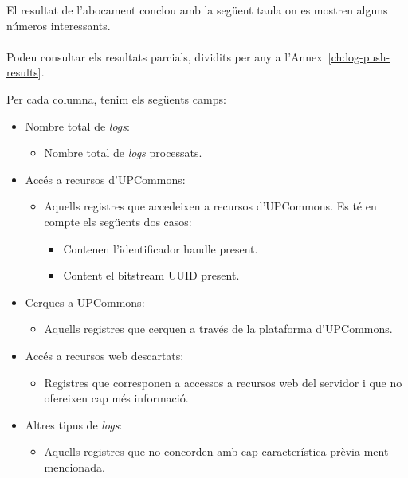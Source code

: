 \noindent
El resultat de l’abocament conclou amb la següent taula on es mostren alguns números interessants. \\ \\
Podeu consultar els resultats parcials, dividits per any a l'Annex~\ref{ch:log-push-results}. \\



\clearpage

\noindent
Per cada columna, tenim els següents camps:

\begin{itemize}
    \item Nombre total de \textit{\gls{log}s}:
    \begin{itemize}
        \item Nombre total de \textit{logs} processats.
    \end{itemize}
    \item Accés a recursos d'\gls{UPCommons}:
    \begin{itemize}
        \item Aquells registres que accedeixen a recursos d’UPCommons. 
        Es té en compte els següents dos casos:
        \begin{itemize}
            \item Contenen l’identificador \gls{handle} present.
            \item Content el \gls{bitstream} \gls{UUID} present.
        \end{itemize}
    \end{itemize}
    \item Cerques a \gls{UPCommons}:
    \begin{itemize}
        \item Aquells registres que cerquen a través de la plataforma d’\gls{UPCommons}.
    \end{itemize}
    \item Accés a recursos web descartats:
    \begin{itemize}
        \item Registres que corresponen a accessos a recursos web del servidor i que no ofereixen cap més informació.
    \end{itemize}
    \item Altres tipus de \textit{logs}:
    \begin{itemize}
        \item Aquells registres que no concorden amb cap característica prèvia-ment mencionada.

\end{itemize}
\end{itemize}
